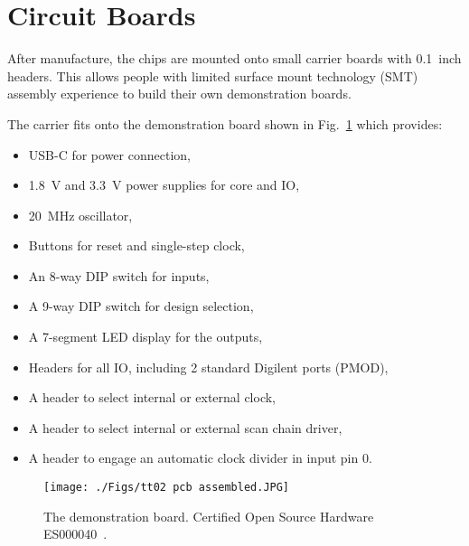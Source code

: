 \section{Circuit Boards}
\label{sec:circuit_board}
After manufacture, the chips are mounted onto small carrier boards with 0.1~inch headers. This allows people with limited surface mount technology (SMT) assembly experience to build their own demonstration boards.

The carrier fits onto the demonstration board shown in Fig.~\ref{fig:demonstration_board} which provides:
\begin{itemize}
\item USB-C for power connection,
\item \qty{1.8}{\V} and \qty{3.3}{\V} power supplies for core and IO,
\item \qty{20}{\MHz} oscillator,
\item Buttons for reset and single-step clock,
\item An 8-way DIP switch for inputs,
\item A 9-way DIP switch for design selection,
\item A 7-segment LED display for the outputs,
\item Headers for all IO, including 2 standard Digilent ports (PMOD),
\item A header to select internal or external clock,
\item A header to select internal or external scan chain driver,
\item A header to engage an automatic clock divider in input pin 0.
\end{itemize}

\begin{figure}[!t]
\centering
\texttt{[image: ./Figs/tt02 pcb assembled.JPG]}
\caption{The demonstration board. Certified Open Source Hardware ES000040~\cite{oshwacertification}.}
\label{fig:demonstration_board}
\end{figure}
